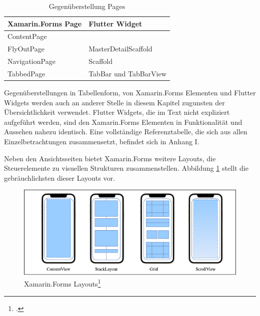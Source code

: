 \begin{table}[!ht]
\begin{tabularx}{\textwidth}{X|X}
   \textbf{Xamarin.Forms Page} & \textbf{Flutter Widget}  \\
\hline
	ContentPage            &           	\\ 
	FlyOutPage             & MasterDetailScaffold          	\\ 
	NavigationPage       & Scaffold         	 					\\ 
	TabbedPage            & TabBar und TabBarView 		\\ 
\end{tabularx}
\caption{Gegenüberstellung Pages}
 \label{tab:CompareXFFlutter}
\end{table}
Gegenüberstellungen in Tabellenform, von Xamarin.Forms Elementen und Flutter Widgets werden auch an anderer Stelle in diesem Kapitel zugunsten der Übersichtlichkeit verwendet.  Flutter Widgets, die im Text nicht expliziert aufgeführt werden,  sind den Xamarin.Forms Elementen in Funktionalität und Aussehen nahezu identisch.  Eine vollständige Referenztabelle,  die sich aus allen Einzelbetrachtungen zusammensetzt,  befindet sich in Anhang I.

Neben den Ansichtsseiten bietet Xamarin.Forms weitere Layouts,  die Steuerelemente zu visuellen Strukturen zusammenstellen.  Abbildung \ref{fig:Xamarin.Forms Layouts} stellt die gebräuchlichsten dieser Layouts vor. 

\begin{figure}[!ht]
 \includegraphics[width=\textwidth,height=\textheight,keepaspectratio]{Images/CrossPlattformFrameworks/XamarinFormsLayouts.png}
 \caption[Xamarin.Forms Layouts]{Xamarin.Forms Layouts\footcite{MicrosoftXamViews2020}}
 \label{fig:Xamarin.Forms Layouts}
\end{figure}

